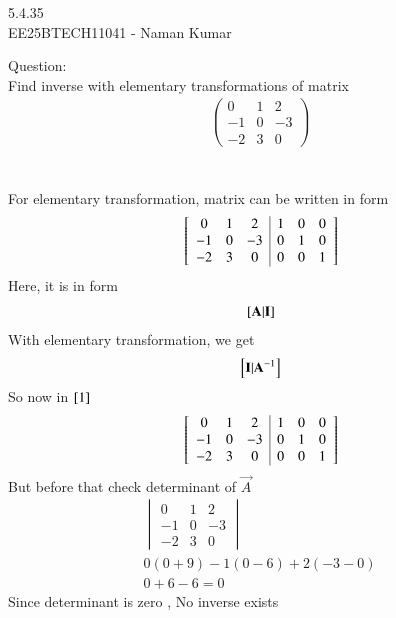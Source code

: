 \documentclass[journal]{IEEEtran}
\author{EE25BTECH11041-Naman Kumar }
\begin{document}
\begin{center}
    \huge{5.4.35}\\
    \large{EE25BTECH11041 - Naman Kumar}
\end{center}
Question:\\
Find inverse with elementary transformations of matrix
\begin{align}
\begin{pmatrix}0&1&2\\-1&0&-3\\-2&3&0\end{pmatrix}
\end{align} \\
\solution \\
For elementary transformation, matrix can be written in form
\begin{align}
    {}\left[\begin{array}{ccc|ccc}
        0  & 1 & 2 & 1 & 0 & 0\\
        -1 & 0 &-3 & 0 & 1 & 0\\
        -2 & 3 & 0 & 0 & 0 & 1
    \end{array}\right] \label{1}
\end{align}
Here, it is in form
\begin{align}
    {}\left[\mathbf{A}\vert \mathbf{I}\right]
\end{align}
With elementary transformation, we get
\begin{align}
    {}\left[\mathbf{I}\vert \mathbf{A}^{-1}\right]
\end{align}
So now in $\eqref{1}$
\begin{align}
    {}\left[\begin{array}{ccc|ccc}
        0  & 1 & 2 & 1 & 0 & 0\\
        -1 & 0 &-3 & 0 & 1 & 0\\
        -2 & 3 & 0 & 0 & 0 & 1
    \end{array}\right]
\end{align}
But before that check determinant of $\vec{A}$
\begin{align}
    \begin{vmatrix}
         0  & 1 & 2\\
        -1 & 0 & -3\\
        -2 & 3 & 0
    \end{vmatrix}
    \\
    0(0+9)-1(0-6)+2(-3-0)\\
    0+6-6=0
\end{align}
Since determinant is zero , No inverse exists
\end{document}
